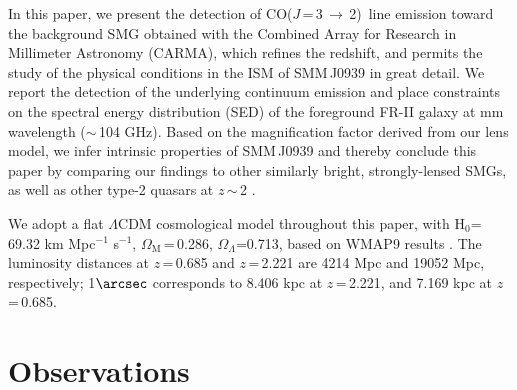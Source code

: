 \documentclass[twocolumn,apj,numberedappendix]{emulateapj}
\newcommand{\CO}{\mbox{CO($J$\,=\,3\,$\rightarrow$\,2) }}
\newcommand{\pmOne}{\mbox{$^{-1}$}}
\begin{document}
In this paper, we present the detection of \CO line emission toward the background SMG obtained with the Combined
Array for Research in Millimeter Astronomy (CARMA), which refines the redshift, and permits the study of the physical conditions in the ISM of SMM\,J0939 in great detail. We report the detection of the underlying continuum emission and place constraints on the spectral energy distribution (SED) of the foreground FR-II galaxy at mm wavelength ($\sim$\,104 GHz). Based on the magnification factor derived from our lens model, we infer intrinsic properties of SMM\,J0939 and thereby 
conclude this paper by comparing our findings to other similarly bright, strongly-lensed SMGs, as well as other type-2 quasars at $z$\,$\sim$\,2 .

We adopt a flat $\Lambda$CDM cosmological model throughout this paper, with H$_0$= 69.32 km\,\,Mpc\pmOne\,\,s\pmOne, $\Omega_\textrm{M}$\,=\,0.286, $\Omega_\Lambda$=0.713, based on WMAP9 results \citep{Hinshaw13a}.
The luminosity distances at $z$\,=\,0.685 and $z$\,=\,2.221 are 4214 Mpc and 19052 Mpc, respectively; 1$\arcsec$
corresponds to 8.406 kpc at $z$\,=\,2.221, and 7.169 kpc at $z$\,=\,0.685.

\section{Observations}\label{sec:obs}
\end{document}
